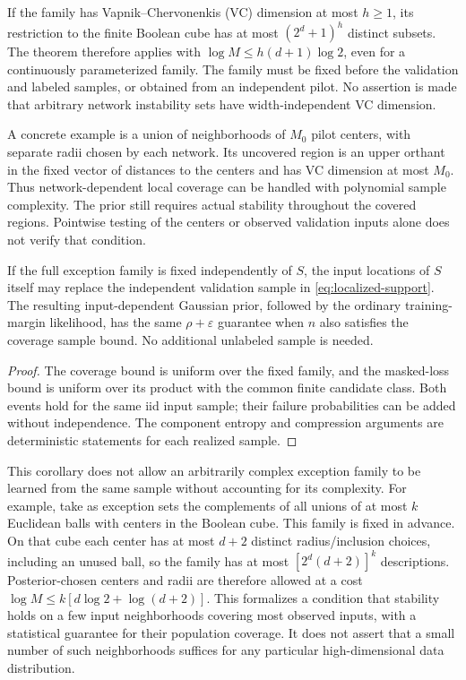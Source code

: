 
If the family has Vapnik--Chervonenkis (VC) dimension at most $h\ge1$, its restriction to the
finite Boolean cube has at most $(2^d+1)^h$ distinct subsets. The theorem
therefore applies with $\log M\le h(d+1)\log2$, even for a continuously
parameterized family. The family must be fixed before the validation and
labeled samples, or obtained from an independent pilot. No assertion is
made that arbitrary network instability sets have width-independent VC
dimension.

A concrete example is a union of neighborhoods of $M_0$ pilot centers,
with separate radii chosen by each network. Its uncovered region is an
upper orthant in the fixed vector of distances to the centers and has VC
dimension at most $M_0$. Thus network-dependent local coverage can be
handled with polynomial sample complexity. The prior still requires
actual stability throughout the covered regions. Pointwise testing of the
centers or observed validation inputs alone does not verify that condition.


\begin{corollary}
\label{cor:localized-same-inputs}
If the full exception family is fixed independently of $S$, the input
locations of $S$ itself may replace the independent validation sample in
\eqref{eq:localized-support}. The resulting input-dependent Gaussian prior,
followed by the ordinary training-margin likelihood, has the same
$\rho+\varepsilon$ guarantee when $n$ also satisfies the coverage sample
bound. No additional unlabeled sample is needed.
\end{corollary}
\begin{proof}
The coverage bound is uniform over the fixed family, and the masked-loss
bound is uniform over its product with the common finite candidate class.
Both events hold for the same iid input sample; their failure probabilities
can be added without independence. The component entropy and compression
arguments are deterministic statements for each realized sample.
\end{proof}

This corollary does not allow an arbitrarily complex exception family to be
learned from the same sample without accounting for its complexity. For
example, take as exception sets the complements of all unions of at most
$k$ Euclidean balls with centers in the Boolean cube. This family is fixed
in advance. On that cube each center
has at most $d+2$ distinct radius/inclusion choices, including an unused
ball, so the family has at most $[2^d(d+2)]^k$ descriptions. Posterior-chosen
centers and radii are therefore allowed at a cost
$\log M\le k[d\log2+\log(d+2)]$. This formalizes a condition that stability
holds on a few input neighborhoods covering most observed inputs, with a
statistical guarantee for their population coverage. It does not assert
that a small number of such neighborhoods suffices for any particular
high-dimensional data distribution.
